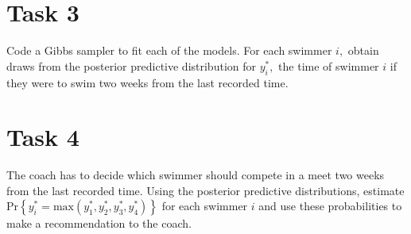 \documentclass{article}
\begin{document}
\section*{Task 3}

Code a Gibbs sampler to fit each of the models. For each swimmer $i,$ obtain draws from the posterior predictive distribution for $y_i^{*},$ the time of swimmer $i$ if they were to swim two weeks from the last recorded time.

\section*{Task 4}

The coach has to decide which swimmer should compete in a meet two weeks from the last recorded time. Using the posterior predictive distributions, estimate $\text{Pr}\left\{y_i^{*}=\text{max}\left(y_1^{*},y_2^{*},y_3^{*},y_4^{*}\right)\right\}$ for each swimmer $i$ and use these probabilities to make a recommendation to the coach. 
\end{document}
